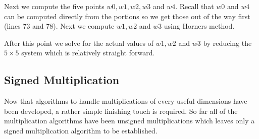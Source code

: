 \documentclass[b5paper]{book}
\begin{document}
Next we compute the five points $w0, w1, w2, w3$ and $w4$.  Recall that $w0$ and $w4$ can be computed directly from the portions so
we get those out of the way first (lines 73 and 78).  Next we compute $w1, w2$ and $w3$ using Horners method.

After this point we solve for the actual values of $w1, w2$ and $w3$ by reducing the $5 \times 5$ system which is relatively
straight forward.  

\subsection{Signed Multiplication}
Now that algorithms to handle multiplications of every useful dimensions have been developed, a rather simple finishing touch is required.  So far all
of the multiplication algorithms have been unsigned multiplications which leaves only a signed multiplication algorithm to be established.  
\end{document}
